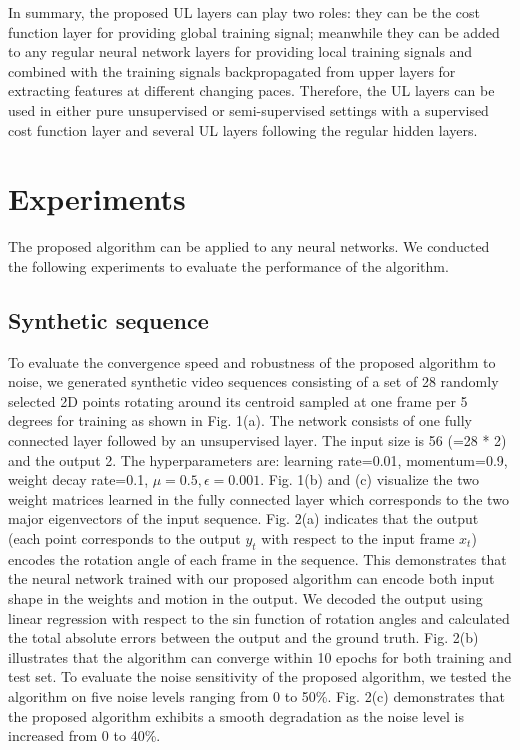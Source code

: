 \documentclass{article}
\begin{document}
In summary, the proposed UL layers can play two roles: they can be
 the cost function layer for providing global training signal; meanwhile they
 can be added to any regular neural network layers for providing local training
signals and combined with the training signals backpropagated from upper layers
for extracting features at different changing paces. Therefore, the UL layers can be used in 
either pure unsupervised or semi-supervised settings with a supervised cost function layer
and several UL layers following the regular hidden layers.  

\section{Experiments}
The proposed algorithm can be applied to any neural networks. We conducted the 
following experiments to evaluate the performance of the algorithm.

\subsection{Synthetic sequence}
To evaluate the convergence speed and robustness of the proposed algorithm 
to noise, we generated synthetic video sequences consisting of a set of 28 
randomly selected 2D 
points rotating around its centroid sampled at one frame per 5 degrees for 
training as shown in Fig. 1(a). The network consists of one fully connected layer followed by an 
unsupervised layer. The input size is 56 (=28 * 2) and the output 2. 
The hyperparameters are: learning rate=0.01, momentum=0.9, weight decay rate=0.1, $\mu=0.5, \epsilon=0.001$. 
Fig. 1(b) and (c) visualize the two weight matrices learned in the fully 
connected layer which corresponds to the two major eigenvectors of the input 
sequence. 
Fig. 2(a) indicates that the output (each point corresponds to the output 
$y_t$ with respect to the input frame $x_t$) encodes the rotation angle of each frame in the sequence. This demonstrates that the neural network trained with our proposed algorithm can encode both input shape in the weights and motion in the output. We decoded the output using linear regression with respect to 
the sin function
of rotation angles and calculated the total absolute errors between the output and the ground truth. Fig. 2(b) illustrates 
that the algorithm can converge within 10 epochs for both training and test set.
To evaluate the noise sensitivity of the proposed algorithm, we tested the 
algorithm on five noise levels ranging from 0 to 50\%. Fig. 2(c) demonstrates 
that the proposed algorithm exhibits a smooth degradation as the noise level is 
increased from 0 to 40\%.
\end{document}
